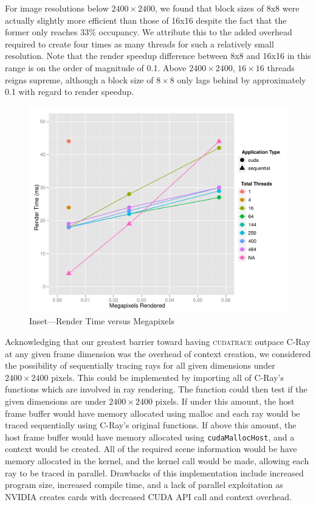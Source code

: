 \documentclass[12pt]{article}
\begin{document}
For image resolutions below $2400 \times 2400$, we found that block sizes of 8x8 were actually slightly more efficient than those of 16x16 despite the fact that the former only reaches 33\% occupancy. We attribute this to the added overhead required to create four times as many threads for such a relatively small resolution. Note that the render speedup difference between 8x8 and 16x16 in this range is on the order of magnitude of 0.1. Above $2400 \times 2400$, $16 \times 16$ threads reigns supreme, although a block size of $8 \times 8$ only lags behind by approximately 0.1 with regard to render speedup.

\begin{figure}
    \caption{Inset---Render Time versus Megapixels} \label{fig:render_no_jitter_time_zoom3}
    \begin{center}
\includegraphics{cudatrace-011}
    \end{center}
\end{figure}

Acknowledging that our greatest barrier toward having \textsc{cudatrace} outpace C-Ray at any given frame dimension was the overhead of context creation, we considered the possibility of sequentially tracing rays for all given dimensions under $2400 \times 2400$ pixels. This could be implemented by importing all of C-Ray's functions which are involved in ray rendering. The function could then test if the given dimensions are under $2400 \times 2400$ pixels. If under this amount, the host frame buffer would have memory allocated using malloc and each ray would be traced sequentially using C-Ray's original functions. If above this amount, the host frame buffer would have memory allocated using \texttt{cudaMallocHost}, and a context would be created. All of the required scene information would be have memory allocated in the kernel, and the kernel call would be made, allowing each ray to be traced in parallel. Drawbacks of this implementation include increased program size, increased compile time, and a lack of parallel exploitation as NVIDIA creates cards with decreased CUDA API call and context overhead. 
\end{document}
